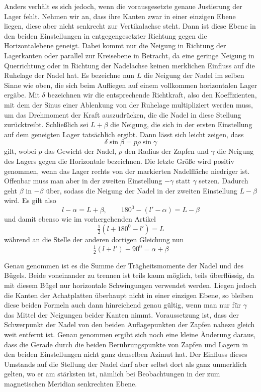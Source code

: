 Anders verhält es sich jedoch, wenn die vorausgesetzte genaue Justierung der Lager fehlt. Nehmen wir an, dass ihre Kanten zwar in einer einzigen Ebene liegen, diese aber nicht senkrecht zur Vertikalachse steht. Dann ist diese Ebene in den beiden Einstellungen in entgegengesetzter Richtung gegen die Horizontalebene geneigt. Dabei kommt nur die Neigung in Richtung der Lagerkanten oder parallel zur Kreisebene in Betracht, da eine geringe Neigung in Querrichtung oder in Richtung der Nadelachse keinen merklichen Einfluss auf die Ruhelage der Nadel hat. Es bezeichne nun $L$ die Neigung der Nadel im selben Sinne wie oben, die sich beim Aufliegen auf einem vollkommen horizontalen Lager ergäbe. Mit $\delta$ bezeichnen wir die entsprechende Richtkraft, also den Koeffizienten, mit dem der Sinus einer Ablenkung von der Ruhelage multipliziert werden muss, um das Drehmoment der Kraft auszudrücken, die die Nadel in diese Stellung zurücktreibt. Schließlich sei $L+\beta$ die Neigung, die sich in der ersten Einstellung auf dem geneigten Lager tatsächlich ergibt. Dann lässt sich leicht zeigen, dass
\[
\delta\sin\beta=p\rho\sin\gamma
\]
gilt, wobei $p$ das Gewicht der Nadel, $\rho$ den Radius der Zapfen und $\gamma$ die Neigung des Lagers gegen die Horizontale bezeichnen. Die letzte Größe wird positiv genommen, wenn das Lager rechts von der markierten Nadelfläche niedriger ist. Offenbar muss man aber in der zweiten Einstellung $-\gamma$ statt $\gamma$ setzen. Dadurch geht $\beta$ in $-\beta$ über, sodass die Neigung der Nadel in der zweiten Einstellung $L-\beta$ wird. Es gilt also
\[
l-\alpha=L+\beta,\qquad180^0-(l'-\alpha)=L-\beta
\]
und damit ebenso wie im vorhergehenden Artikel
\[
\tfrac{1}{2}(l+180^0-l')=L
\]
während an die Stelle der anderen dortigen Gleichung nun
\[
\tfrac{1}{2}(l+l')-90^0=\alpha+\beta
\]


\expandafter\def\csname HistoricalNoteText465\endcsname{Genau genommen ist es die Summe der Trägheitsmomente der Nadel und des Bügels. Beide voneinander zu trennen ist teils kaum möglich, teils überflüssig, da mit diesem Bügel nur horizontale Schwingungen verwendet werden.}
Liegen jedoch die Kanten der Achatplatten überhaupt nicht in einer einzigen Ebene, so bleiben diese beiden Formeln auch dann hinreichend genau gültig, wenn man nur für $\gamma$ das Mittel der Neigungen beider Kanten nimmt. Voraussetzung ist, dass der Schwerpunkt der Nadel von den beiden Auflagepunkten der Zapfen nahezu gleich weit entfernt ist. Genau genommen ergibt sich noch eine kleine Änderung daraus, dass die Gerade durch die beiden Berührungspunkte von Zapfen und Lagern in den beiden Einstellungen nicht ganz denselben Azimut hat. Der Einfluss dieses Umstands auf die Stellung der Nadel darf aber selbst dort als ganz unmerklich gelten, wo er am stärksten ist, nämlich bei Beobachtungen in der zum magnetischen Meridian senkrechten Ebene.

